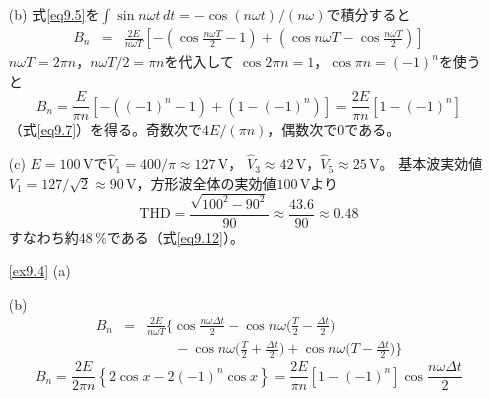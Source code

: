 \begin{enumerate}
(b) 式\ref{eq9.5}を$\int\sin n\omega t\,dt = -\cos(n\omega t)/(n\omega)$で積分すると
\begin{eqnarray*}
B_n &=& \frac{2E}{n\omega T}\left[-\left(\cos\frac{n\omega T}{2}-1\right)
+\left(\cos n\omega T - \cos\frac{n\omega T}{2}\right)\right]
\end{eqnarray*}
$n\omega T = 2\pi n$，$n\omega T/2 = \pi n$を代入して
$\cos2\pi n = 1$，$\cos\pi n = (-1)^n$を使うと
\begin{equation*}
B_n = \frac{E}{\pi n}\left[-((-1)^n-1)+(1-(-1)^n)\right]
= \frac{2E}{\pi n}\left[1-(-1)^n\right]
\end{equation*}
（式\ref{eq9.7}）を得る。奇数次で$4E/(\pi n)$，偶数次で$0$である。

(c) $E = 100$\,Vで$\hat{V}_1 = 400/\pi \approx 127$\,V，
$\hat{V}_3 \approx 42$\,V，$\hat{V}_5 \approx 25$\,V。
基本波実効値$V_1 = 127/\sqrt{2} \approx 90$\,V，方形波全体の実効値$100$\,Vより
\begin{equation*}
\mathrm{THD} = \frac{\sqrt{100^2 - 90^2}}{90} \approx \frac{43.6}{90} \approx 0.48
\end{equation*}
すなわち約$48$\,\%である（式\ref{eq9.12}）。

\item[\ref{ex9.4}]
(a) 

(b) 
\begin{eqnarray*}
B_n &=& \frac{2E}{n\omega T}\Big\{
\cos\frac{n\omega\mathit{\Delta}t}{2} - \cos n\omega\Big(\frac{T}{2}-\frac{\mathit{\Delta}t}{2}\Big) \\
&& \qquad - \cos n\omega\Big(\frac{T}{2}+\frac{\mathit{\Delta}t}{2}\Big) + \cos n\omega\Big(T-\frac{\mathit{\Delta}t}{2}\Big)\Big\}
\end{eqnarray*}
\begin{equation*}
B_n = \frac{2E}{2\pi n}\left\{2\cos x - 2(-1)^n\cos x\right\}
= \frac{2E}{\pi n}\left[1-(-1)^n\right]\cos\frac{n\omega\mathit{\Delta}t}{2}
\end{equation*}


\end{enumerate}
